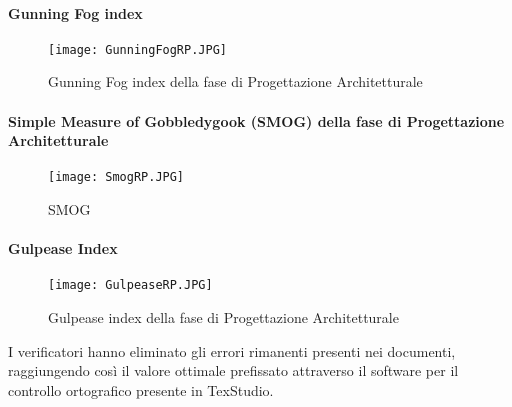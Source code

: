 \paragraph{Gunning Fog index}
\hspace{15cm}
\begin{figure}[!htbp]
	\centering
	\texttt{[image: GunningFogRP.JPG]}
	\caption{Gunning Fog index della fase di Progettazione Architetturale }
\end{figure}
\clearpage
\paragraph{Simple Measure of Gobbledygook (SMOG) della fase di Progettazione Architetturale }
\hspace{15cm}
\begin{figure}[!htbp]
	\centering
	\texttt{[image: SmogRP.JPG]}
	\caption{SMOG}
\end{figure}
\newpage
\paragraph{Gulpease Index}
\hspace{15cm}
\begin{figure}[!htbp]
	\centering
	\texttt{[image: GulpeaseRP.JPG]}
	\caption{Gulpease index della fase di Progettazione Architetturale }
\end{figure}

 I verificatori hanno eliminato gli errori rimanenti presenti nei documenti, raggiungendo così il valore ottimale prefissato attraverso il software per il controllo ortografico presente in TexStudio. 